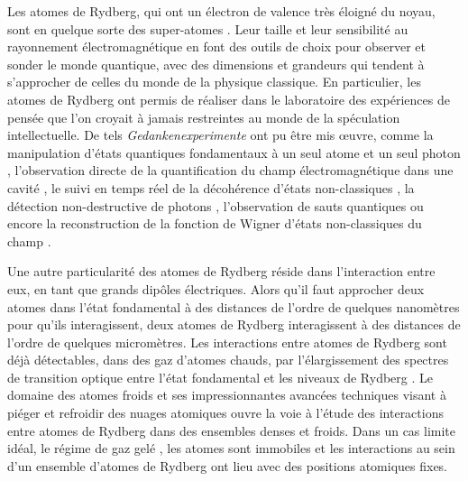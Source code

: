 \bigskip

Les atomes de Rydberg, qui ont un électron de valence très éloigné du noyau, sont en quelque sorte des \og super-atomes \fg{}. Leur taille et leur sensibilité au rayonnement électromagnétique en font des outils de choix pour observer et sonder le monde quantique, avec des dimensions et grandeurs qui tendent à s'approcher de celles du monde de la physique classique.
En particulier, les atomes de Rydberg ont permis de réaliser dans le laboratoire des expériences de pensée que l'on croyait à jamais restreintes au monde de la spéculation intellectuelle.
De tels \textit{Gedankenexperimente} ont pu être mis \oe uvre, comme la manipulation d'états quantiques fondamentaux à un seul atome et un seul photon \cite{ENS_EXPTWOPHOTON},
l'observation directe de la quantification du champ électromagnétique dans une cavité \cite{ENS_QRABI},
le suivi en temps réel de la décohérence d'états non-classiques \cite{ENS_CAT,ENS_RMP},
la détection non-destructive de photons \cite{ENS_QND,ENS_COUNT05},
l'observation de sauts quantiques \cite{ENS_QNDZEROUN07,ENS_QNDCOLLAPSE07}
ou encore la reconstruction de la fonction de Wigner d'états non-classiques du champ \cite{ENS_FULLWIGNER08}.

Une autre particularité des atomes de Rydberg réside dans l'interaction entre eux, en tant que grands dipôles électriques.
Alors qu'il faut approcher deux atomes dans l'état fondamental à des distances de l'ordre de quelques nanomètres pour qu'ils interagissent, deux atomes de Rydberg interagissent à des distances de l'ordre de quelques micromètres.
Les interactions entre atomes de Rydberg sont déjà détectables, dans des gaz d'atomes chauds, par l'élargissement des spectres de transition optique entre l'état fondamental et les niveaux de Rydberg \cite{ENS_DENSEGAS,ENS_LASERSPEC5SP}.
Le domaine des atomes froids et ses impressionnantes avancées techniques visant à piéger et refroidir des nuages atomiques \cite{Pritchard1983,Dalibard1983,Dalibard1984,Chu1986,CCT1990} ouvre la voie à l'étude des interactions entre atomes de Rydberg dans des ensembles denses et froids.
Dans un cas limite idéal, le régime de \og gaz gelé \fg{} \cite{Gallagher1998,Pillet1998}, les atomes sont immobiles et les interactions au sein d'un ensemble d'atomes de Rydberg ont lieu avec des positions atomiques fixes.

